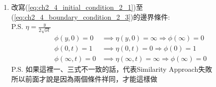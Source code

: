 \documentclass[../main.tex]{subfiles}
\begin{document}
\begin{itemize}
\begin{enumerate}
\begin{itemize}
\begin{enumerate}
\begin{align}
          \right) \nonumber\\
          &= \nu \frac{\partial}{\partial y}\left(
            \frac{\partial \phi}{\partial \eta}\cdot \frac{1}{2\sqrt{\nu t}}
          \right) \nonumber\\
          & = \nu \frac{\partial}{\partial \eta}\left(
            \frac{\partial \phi}{\partial \eta}\cdot \frac{1}{2\sqrt{\nu t}}
          \right)\frac{\partial \eta}{\partial y} \nonumber\\
          &= \nu \left(
            \frac{\partial^2 \phi}{\partial \eta^2}\cdot \frac{1}{2\sqrt{\nu t}}\cdot \frac{1}{2\sqrt{\nu t}}
          \right) \nonumber\\
          &= \nu \left(
            \frac{\partial^2 \phi}{\partial \eta^2}\cdot \frac{1}{4\nu t}
          \right) \nonumber\\
          &= \frac{1}{4t}\cdot \frac{\partial^2 \phi}{\partial \eta^2} \label{eq:ch2_4_unsteady_state_nu_partial2_phi_partial_y2}
        \end{align}
        兩式相等:
        \begin{align}
          & \frac{\partial \phi}{\partial \eta}\left(
           -\frac{\eta}{2t}
          \right) = \frac{1}{4t}\cdot \frac{\partial^2 \phi}{\partial \eta^2} \nonumber\\
        \Rightarrow \quad & -2\eta \frac{\partial \phi}{\partial \eta} =
         \frac{\partial^2 \phi}{\partial \eta^2} \nonumber\\
         & \boxed{
          \frac{d^2 \phi}{d \eta^2} + 2\eta \frac{d \phi}{d \eta} = 0
         }
        \end{align}
        成功變成ODE了!
        \item 改寫(\ref{eq:ch2_4_initial_condition_2_1})至(\ref{eq:ch2_4_boundary_condition_2_3})的邊界條件:\\
        P.S. $\eta = \frac{y}{2\sqrt{\nu t}}$
        \begin{align}
          \phi(y,0) = 0& \implies \eta(y,0) = \infty \Rightarrow \phi(\infty) = 0\\
          \phi(0,t) = 1& \implies \eta(0,t) = 0 \Rightarrow \phi(0) = 1\\
          \phi(\infty,t) = 0& \implies \eta(\infty,t) = \infty \Rightarrow \phi(\infty) = 0
        \end{align}
        P.S. 如果這裡一、三式不一致的話，代表Similarity Approach失敗\\
        所以前面才說是因為兩個條件祥同，才能這樣做
        \begin{equation}

\end{equation}
\end{enumerate}
\end{itemize}
\end{enumerate}
\end{itemize}
\end{document}
